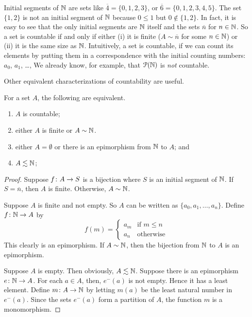 Initial segments of ${\mathbb N}$ are sets like $\overline 4=\{0,1,2,3\}$, or $\overline 6 = \{0,1,2,3,4,5\}$. 
The set $\{1,2\}$ is not an initial segment of ${\mathbb N}$ because $0\leq 1$ but $0\notin \{1,2\}$. In fact, it is easy to see that the only initial segments are ${\mathbb N}$ itself and the sets $\overline n$ for $n\in{\mathbb N}$. 
So a set is countable if and only if either (i) it is finite ($A\sim\overline n$ for some $n\in{\mathbb N}$) or (ii) it is the same size as ${\mathbb N}$. 
Intuitively, a set is countable, if we can count its elements by putting them in a correspondence with the initial counting numbers: $a_0$, $a_1$, \ldots,  
We already know, for example, that ${\mathcal{P}}({\mathbb N})$ is \emph{not} countable.

Other equivalent characterizations of countability are useful.

\begin{theorem}
	For a set $A$, the following are equivalent.
	\begin{enumerate}
		\item $A$ is countable;
		\item either $A$ is finite or $A\sim {\mathbb N}$. 
		\item either $A=\emptyset$ or there is an epimorphism from ${\mathbb N}$ to $A$; and
		\item $A\lesssim{\mathbb N}$;
	\end{enumerate}
	
	\begin{proof}
		Suppose ${f}\colon{A}\to{S}$ is a bijection where $S$ is an initial segment of ${\mathbb N}$. If $S=\overline n$, then $A$ is finite. Otherwise, $A\sim {\mathbb N}$.
		
		Suppose $A$ is finite and not empty. So $A$ can be written as $\{a_0,a_1,\ldots,a_n\}$. Define ${f}\colon{{\mathbb N}}\to{A}$ by 
		\[f(m) = \begin{cases}
		 a_m&\text{if $m\leq n$}\\
		 a_n&\text{otherwise}
		\end{cases}
		\]
		This clearly is an epimorphism. If $A\sim{\mathbb N}$, then the bijection from ${\mathbb N}$ to $A$ is an epimorphism.
		
		Suppose $A$ is empty. Then obviously, $A\lesssim {\mathbb N}$. 
		Suppose there is an epimorphism ${e}\colon{{\mathbb N}}\to{A}$. 
		For each $a\in A$, then, $e^-(a)$ is not empty. 
		Hence it has a least element. 
		Define ${m}\colon{A}\to{{\mathbb N}}$ by letting $m(a)$ be the least natural number in $e^-(a)$. 
		Since the sets $e^-(a)$ form a partition of $A$, the function $m$ is a monomorphism.
		

\end{proof}
\end{theorem}
